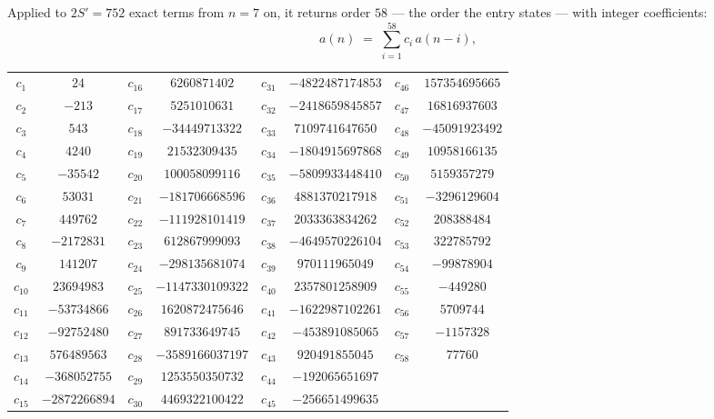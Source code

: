 \documentclass[11pt,a4paper]{article}
\theoremstyle{plain}
\theoremstyle{definition}
\begin{document}
Applied to $2S'=752$ exact terms from $n=7$ on, it returns order $58$ --- the
order the entry states --- with integer coefficients:
\[
a(n)\;=\;\sum_{i=1}^{58}c_i\,a(n-i),
\]
\begin{center}\small
\begin{tabular}{cccccccc}
$c_{1}$ & $24$ & $c_{16}$ & $6260871402$ & $c_{31}$ & $-4822487174853$ & $c_{46}$ & $157354695665$ \\
$c_{2}$ & $-213$ & $c_{17}$ & $5251010631$ & $c_{32}$ & $-2418659845857$ & $c_{47}$ & $16816937603$ \\
$c_{3}$ & $543$ & $c_{18}$ & $-34449713322$ & $c_{33}$ & $7109741647650$ & $c_{48}$ & $-45091923492$ \\
$c_{4}$ & $4240$ & $c_{19}$ & $21532309435$ & $c_{34}$ & $-1804915697868$ & $c_{49}$ & $10958166135$ \\
$c_{5}$ & $-35542$ & $c_{20}$ & $100058099116$ & $c_{35}$ & $-5809933448410$ & $c_{50}$ & $5159357279$ \\
$c_{6}$ & $53031$ & $c_{21}$ & $-181706668596$ & $c_{36}$ & $4881370217918$ & $c_{51}$ & $-3296129604$ \\
$c_{7}$ & $449762$ & $c_{22}$ & $-111928101419$ & $c_{37}$ & $2033363834262$ & $c_{52}$ & $208388484$ \\
$c_{8}$ & $-2172831$ & $c_{23}$ & $612867999093$ & $c_{38}$ & $-4649570226104$ & $c_{53}$ & $322785792$ \\
$c_{9}$ & $141207$ & $c_{24}$ & $-298135681074$ & $c_{39}$ & $970111965049$ & $c_{54}$ & $-99878904$ \\
$c_{10}$ & $23694983$ & $c_{25}$ & $-1147330109322$ & $c_{40}$ & $2357801258909$ & $c_{55}$ & $-449280$ \\
$c_{11}$ & $-53734866$ & $c_{26}$ & $1620872475646$ & $c_{41}$ & $-1622987102261$ & $c_{56}$ & $5709744$ \\
$c_{12}$ & $-92752480$ & $c_{27}$ & $891733649745$ & $c_{42}$ & $-453891085065$ & $c_{57}$ & $-1157328$ \\
$c_{13}$ & $576489563$ & $c_{28}$ & $-3589166037197$ & $c_{43}$ & $920491855045$ & $c_{58}$ & $77760$ \\
$c_{14}$ & $-368052755$ & $c_{29}$ & $1253550350732$ & $c_{44}$ & $-192065651697$ &  &  \\
$c_{15}$ & $-2872266894$ & $c_{30}$ & $4469322100422$ & $c_{45}$ & $-256651499635$ &  &  \\
\end{tabular}
\end{center}
\end{document}
